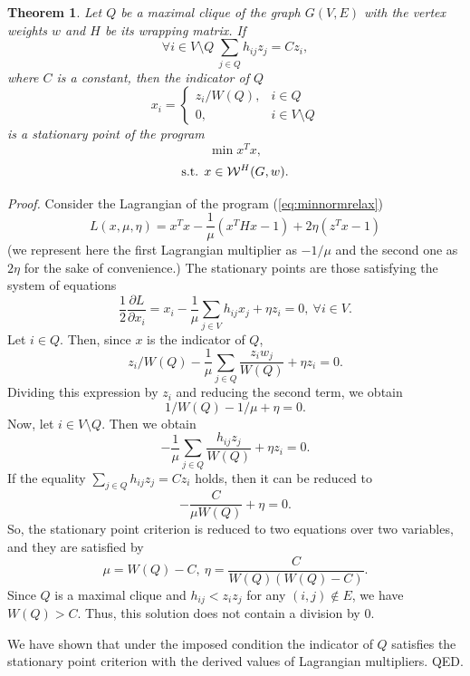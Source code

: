 \documentclass[11pt]{article}
\newtheorem{thm}{Theorem}
\begin{document}
\begin{thm}
\label{thm:exact}
Let $Q$ be a maximal clique of the graph $G(V,E)$ with the vertex weights $w$
and $H$ be its wrapping matrix. If
\begin{equation}
\label{eq:rsclique}
\forall i \in V \setminus Q \ \sum_{j \in Q} h_{ij} z_j = C z_i,
\end{equation}
where $C$ is a constant, then the indicator of $Q$
\[ x_i = \left\{ \begin{array}{ll}
  z_i/W(Q), & i \in Q \\
  0, & i \in V \setminus Q
\end{array} \right. \]
is a stationary point of the program
\begin{equation}
\label{eq:minnormrelax}
\min x^T x,
\end{equation}
\[ \mbox{s.t. } x \in {\cal W}^H(G,w). \]
\end{thm}
{\em Proof.} Consider the Lagrangian of the program (\ref{eq:minnormrelax})
\begin{displaymath}
L(x,\mu,\eta) = x^T x - \frac{1}{\mu}(x^T H x - 1) + 2 \eta (z^T x - 1)
\end{displaymath}
(we represent here the first Lagrangian multiplier as $-1/\mu$ and the second
one as $2 \eta$ for the sake of convenience.) The stationary points are
those satisfying the system of equations
\[
\frac{1}{2} \frac{\partial L}{\partial x_i} = x_i -\frac{1}{\mu} \sum_{j \in V} h_{ij} x_j + \eta z_i = 0, \ \forall i \in V.
\]
Let $i \in Q$. Then, since $x$ is the indicator of $Q$,
\[
z_i/W(Q) -\frac{1}{\mu} \sum_{j \in Q} \frac{z_i w_j}{W(Q)} + \eta z_i = 0.
\]
Dividing this expression by $z_i$ and reducing the second term, we obtain
\[ 1/W(Q) - 1/\mu + \eta = 0. \]
Now, let $i \in V \setminus Q$. Then we obtain
\[ -\frac{1}{\mu} \sum_{j \in Q} \frac{h_{ij} z_j}{W(Q)} + \eta z_i = 0. \]
If the equality $\sum_{j \in Q} h_{ij} z_j = C z_i$ holds, then it can be
reduced to
\[ -\frac{C}{\mu W(Q)} + \eta = 0. \]
So, the stationary point criterion is reduced to two equations over two
variables, and they are satisfied by
\[ \mu = W(Q)-C, \ \eta = \frac{C}{W(Q)(W(Q)-C)}. \]
Since $Q$ is a maximal clique and $h_{ij} < z_i z_j$ for any $(i,j) \notin E$,
we have $W(Q)>C$. Thus, this solution does not contain a division by $0$.

We have shown that under the imposed condition the indicator of $Q$
satisfies the stationary point criterion with the derived values of Lagrangian
multipliers. QED.

\vspace{1pc}
\end{document}
